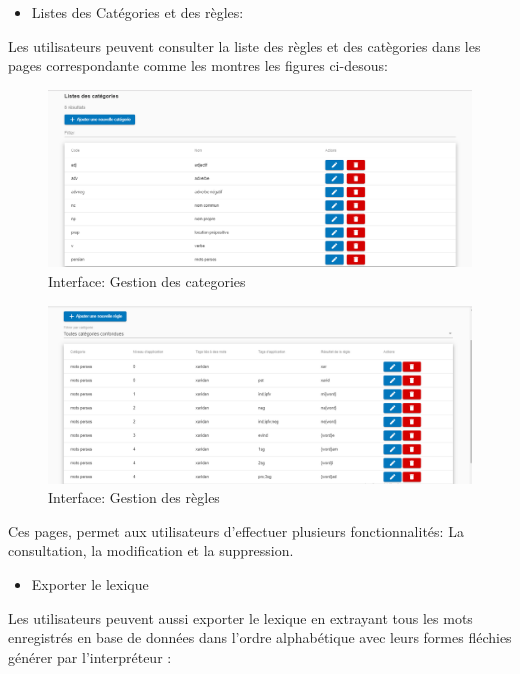 \documentclass[12pt,a4paper]{article}
\begin{document}
\begin{itemize}  
  \item Listes des Catégories et des règles:
\end{itemize}
Les utilisateurs peuvent consulter la liste des règles et des catègories dans les pages correspondante comme les montres les figures ci-desous: 


\begin{figure}[!b]
\centering
\includegraphics{img/GestionCat.PNG}
\caption{Interface: Gestion des categories }
\label{Tux}
\end{figure}

\begin{figure}[!b]
\centering
\includegraphics{img/GestionReg.PNG}
\caption{Interface: Gestion des règles}
\label{Tux}
\end{figure}



Ces pages, permet aux utilisateurs  d'effectuer plusieurs fonctionnalités: La consultation, la modification et la suppression.




\begin{itemize}  
  \item Exporter le lexique
\end{itemize}
Les utilisateurs peuvent aussi exporter le lexique en extrayant tous les mots enregistrés en base de données dans l'ordre alphabétique avec leurs formes fléchies générer par l'interpréteur :
\end{document}
